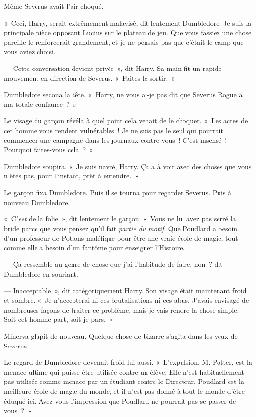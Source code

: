 Même Severus avait l'air choqué.

«~Ceci, Harry, serait extrêmement malavisé, dit lentement Dumbledore. Je suis la principale pièce opposant Lucius sur le plateau de jeu. Que vous fassiez une chose pareille le renforcerait grandement, et je ne pensais pas que c'était le camp que vous aviez choisi.

--- Cette conversation devient privée~», dit Harry. Sa main fit un rapide mouvement en direction de Severus. «~Faites-le sortir.~»

Dumbledore secoua la tête. «~Harry, ne vous ai-je pas dit que Severus Rogue a ma totale confiance~?~»

Le visage du garçon révéla à quel point cela venait de le choquer. «~Les actes de cet homme vous rendent vulnérables~! Je ne suis pas le seul qui pourrait commencer une campagne dans les journaux contre vous~! C'est insensé~! Pourquoi faites-vous cela~?~»

Dumbledore soupira. «~Je suis navré, Harry. Ça a à voir avec des choses que vous n'êtes pas, pour l'instant, prêt à entendre.~»

Le garçon fixa Dumbledore. Puis il se tourna pour regarder Severus. Puis à nouveau Dumbledore.

«~C'\emph{est} de la folie~», dit lentement le garçon. «~Vous ne lui avez pas serré la bride parce que vous pensez qu'il fait \emph{partie du motif}. Que Poudlard a besoin d'un professeur de Potions maléfique pour être une vraie école de magie, tout comme elle a besoin d'un fantôme pour enseigner l'Histoire.

--- Ça ressemble au genre de chose que j'ai l'habitude de faire, non~? dit Dumbledore en souriant.

--- Inacceptable~», dit catégoriquement Harry. Son visage était maintenant froid et sombre. «~Je n'accepterai ni ces brutalisations ni ces abus. J'avais envisagé de nombreuses façons de traiter ce problème, mais je vais rendre la chose simple. Soit cet homme part, soit je pars.~»

Minerva glapit de nouveau. Quelque chose de bizarre s'agita dans les yeux de Severus.

Le regard de Dumbledore devenait froid lui aussi. «~L'expulsion, M. Potter, est la menace ultime qui puisse être utilisée contre un élève. Elle n'est habituellement pas utilisée comme menace par un étudiant contre le Directeur. Poudlard est la meilleure école de magie du monde, et il n'est pas donné à tout le monde d'être éduqué ici. Avez-vous l'impression que Poudlard ne pourrait pas se passer de vous~?~»

